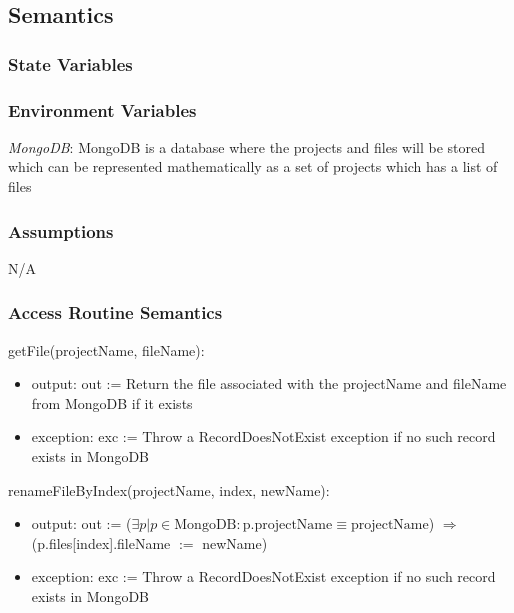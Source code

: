 \documentclass[12pt, titlepage]{article}
\begin{document}
	\subsection{Semantics}
	
	\subsubsection{State Variables}
	
	\subsubsection{Environment Variables}
	
	\textit{MongoDB}: MongoDB is a database where the projects and files will be stored which can be represented mathematically as a set of projects which has a list of files
	
	\subsubsection{Assumptions}
	
	N/A
	
	\subsubsection{Access Routine Semantics}
	
	\noindent getFile(projectName, fileName):
	\begin{itemize}
		
		\item output: out := Return the file associated with the projectName and fileName from MongoDB if it exists
		
		\item exception: exc := Throw a RecordDoesNotExist exception if no such record exists in MongoDB
		
	\end{itemize}
	
	\noindent renameFileByIndex(projectName, index, newName):
	\begin{itemize}
		
		\item output: out := ($\exists p| p \in \text{MongoDB} : \text{p.projectName} \equiv \text{projectName}$) $\Rightarrow$ (p.files[index].fileName $:=$ newName)
		
		\item exception: exc := Throw a RecordDoesNotExist exception if no such record exists in MongoDB
		
	\end{itemize}
	
\end{document}
